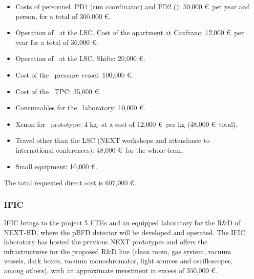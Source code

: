 \begin{itemize}[noitemsep,topsep=0pt,parsep=0pt,partopsep=0pt]
\item Costs of personnel. PD1 (run coordinator) and PD2 (\HDEMO):  50,000 \euro\ per year and person, for a total of 300,000 \euro. 
\item Operation of \Next\ at the LSC. Cost of the apartment at Canfranc: 12,000 \euro\ per year for a total of 36,000 \euro. 
\item Operation of \Next\ at the LSC. Shifts: 20,000 \euro.
\item Cost of the \HDEMO\ pressure vessel: 100,000 \euro.
\item Cost of the \HDEMO\ TPC: 35,000 \euro.
\item Consumables for the \HDEMO\ laboratory: 10,000 \euro.
\item Xenon for \HDEMO\ prototype: 4 kg, at a cost of  12,000 \euro\ per kg (48,000 \euro\ total). 
\item Travel other than the LSC (NEXT workshops and attendance to international conferences): 48,000 \euro\ for the whole team. 
\item Small equipment: 10,000 \euro.
\end{itemize}

The total requested direct cost is 607,000 \euro. 

\subsubsection{IFIC}

IFIC brings to the project 5 FTEs and an equipped laboratory for the R\&D of NEXT-HD, where the pBFD detector will be developed and operated. The IFIC laboratory has hosted the previous NEXT prototypes and offers the infrastructures for the proposed R\&D line (clean room, gas system, vacuum vessels, dark boxes, vacuum monochromator, light sources and oscilloscopes, among others), with an approximate investment in excess of 350,000 \euro. 

